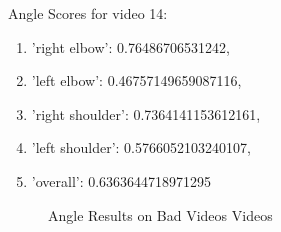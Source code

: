   Angle Scores for video 14: 
  \begin{enumerate}
      \item 'right elbow': 0.76486706531242, 
      \item 'left elbow': 0.46757149659087116, 
      \item 'right shoulder': 0.7364141153612161, 
      \item 'left shoulder': 0.5766052103240107, 
      \item 'overall': 0.6363644718971295
  \end{enumerate}

  \begin{figure}[ht] 
   \quad 
    \caption{Angle Results on Bad Videos Videos} 
    \centering
    \label{fig:angles_bad}
  \end{figure}

